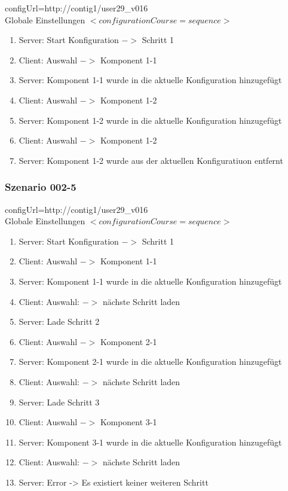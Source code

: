 \documentclass{article}
\begin{document}
configUrl=http://contig1/user29\_v016\\

Globale Einstellungen $<configurationCourse=sequence>$

\begin{enumerate}
  \item Server: Start Konfiguration $->$ Schritt 1
  \item Client: Auswahl $->$ Komponent 1-1
  \item Server: Komponent 1-1 wurde in die aktuelle Konfiguration hinzugef\"ugt
  \item Client: Auswahl $->$ Komponent 1-2
  \item Server: Komponent 1-2 wurde in die aktuelle Konfiguration hinzugef\"ugt
  \item Client: Auswahl $->$ Komponent 1-2
  \item Server: Komponent 1-2 wurde aus der aktuellen Konfiguratiuon entfernt
\end{enumerate}

\subsubsection{Szenario 002-5}

configUrl=http://contig1/user29\_v016\\

Globale Einstellungen $<configurationCourse=sequence>$

\begin{enumerate}
  \item Server: Start Konfiguration $->$ Schritt 1
  \item Client: Auswahl $->$ Komponent 1-1
  \item Server: Komponent 1-1 wurde in die aktuelle Konfiguration hinzugef\"ugt
  \item Client: Auswahl: $->$ n\"achste Schritt laden
  \item Server: Lade Schritt 2
  \item Client: Auswahl $->$ Komponent 2-1
  \item Server: Komponent 2-1 wurde in die aktuelle Konfiguration hinzugef\"ugt
  \item Client: Auswahl: $->$ n\"achste Schritt laden
  \item Server: Lade Schritt 3
  \item Client: Auswahl $->$ Komponent 3-1
  \item Server: Komponent 3-1 wurde in die aktuelle Konfiguration hinzugef\"ugt
  \item Client: Auswahl: $->$ n\"achste Schritt laden
  \item Server: Error -> Es existiert keiner weiteren Schritt
\end{enumerate}
\end{document}
